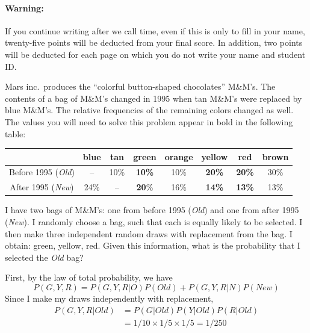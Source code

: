 \documentclass[addpoints,12pt]{exam}
\begin{document}
\paragraph{Warning:} If you continue writing after we call time, even if this is only to fill in your name, twenty-five points will be deducted from your final score. In addition, two points will be deducted for each page on which you do not write your name and student ID. 

\newpage

\begin{questions}


  \question[35] Mars inc.\ produces the ``colorful button-shaped chocolates'' M\&M's.
  The contents of a bag of M\&M's changed in 1995 when tan M\&M's were replaced by blue M\&M's.
  The relative frequencies of the remaining colors changed as well.
  The values you will need to solve this problem appear in bold in the following table:
  \begin{center}
    \begin{tabular}{c|ccccccc}
      & blue & tan & \textbf{green} & orange & \textbf{yellow} & \textbf{red} & brown \\
      \hline
      Before 1995 (\emph{Old}) & -- & 10\% & \textbf{10\%} & 10\% & \textbf{20\%} & \textbf{20\%} & 30\% \\
      After 1995 (\emph{New}) & 24\%& -- & \textbf{20}\% & 16\% & \textbf{14\%} & \textbf{13\%} & 13\%
    \end{tabular}
  \end{center}
  I have two bags of M\&M's: one from before 1995 (\emph{Old}) and one from after 1995 (\emph{New}).
I randomly choose a bag, such that each is equally likely to be selected.
I then make three independent random draws with replacement from the bag. 
I obtain: green, yellow, red.
Given this information, what is the probability that I selected the \emph{Old} bag?
\begin{solution}[6in]
First, by the law of total probability, we have
\[P(G,Y,R) = P(G,Y,R|O)P(Old) + P(G,Y,R|N)P(New)\]
Since I make my draws independently with replacement,
\begin{align*}
P(G,Y,R|Old) &= P(G|Old)P(Y|Old)P(R|Old)\\
&= 1/10 \times 1/5 \times 1/5 = 1/250

\end{align*}
\end{solution}
\end{questions}
\end{document}
